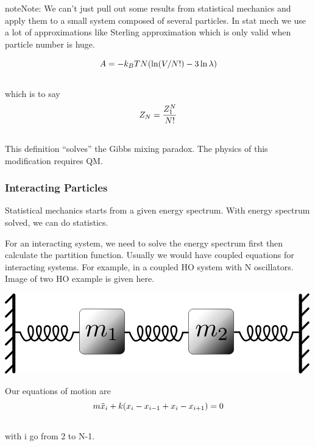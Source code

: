\documentclass[letterpaper,10pt,english]{sphinxmanual}
\begin{document}
\begin{notice}{note}{Note:}
We can't just pull out some results from statistical mechanics and apply them to a small system composed of several particles. In stat mech we use a lot of approximations like Sterling approximation which is only valid when particle number is huge.
\end{notice}
\begin{gather}
\begin{split}A = - k_B T N ( \ln(V/N!) - 3 \ln \lambda)\end{split}\notag\\\begin{split}\end{split}\notag
\end{gather}
which is to say
\begin{gather}
\begin{split}Z_N = \frac{Z_1^N}{N!}\end{split}\notag\\\begin{split}\end{split}\notag
\end{gather}
This definition ``solves'' the Gibbs mixing paradox. The physics of this modification requires QM.


\subsubsection{Interacting Particles}
\label{equilibrium/week3:interacting-particles}
Statistical mechanics starts from a given energy spectrum. With energy spectrum solved, we can do statistics.

For an interacting system, we need to solve the energy spectrum first then calculate the partition function. Usually we would have coupled equations for interacting systems. For example, in a coupled HO system with N oscillators. Image of two HO example is given here.

{\hfill\includegraphics{Coupled_Harmonic_Oscillator.png}\hfill}

Our equations of motion are
\begin{gather}
\begin{split}m \ddot x_i + k( x_i -x_{i-1} + x_i - x_{i+1}) =0\end{split}\notag\\\begin{split}\end{split}\notag
\end{gather}
with i go from 2 to N-1.
\end{document}
